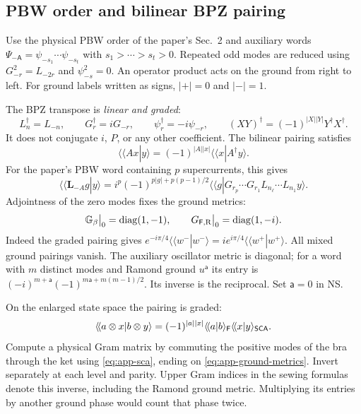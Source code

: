 \subsection{PBW order and bilinear BPZ pairing}
\label{app:pbw}

Use the physical PBW order of the paper's Sec.~2 and auxiliary words
$\Psi_{-\mathsf A}=\psi_{-s_1}\cdots\psi_{-s_t}$ with
$s_1>\cdots>s_t>0$. Repeated odd modes are reduced using
$G_{-r}^2=L_{-2r}$ and $\psi_{-s}^2=0$.
An operator product acts on the ground from right to left.
For ground labels written as signs, $|+|=0$ and $|-|=1$.

The BPZ transpose is \emph{linear and graded}:
\begin{equation}
 L_n^\dagger=L_{-n},\qquad G_r^\dagger=iG_{-r},\qquad
 \psi_r^\dagger=-i\psi_{-r},\qquad
 (XY)^\dagger=(-1)^{|X||Y|}Y^\dagger X^\dagger.
 \label{eq:app-adjoint}
\end{equation}
It does not conjugate $i$, $P$, or any other coefficient. The
bilinear pairing satisfies
\begin{equation}
 \langle\!\langle Ax|y\rangle
 =(-1)^{|A||x|}\langle\!\langle x|A^\dagger y\rangle.
 \label{eq:app-adjoint-pair}
\end{equation}
For the paper's PBW word containing $p$ supercurrents, this gives
\begin{equation}
 \langle\!\langle\mathbf L_{-A}g|y\rangle
 =i^p(-1)^{p|g|+p(p-1)/2}
 \langle\!\langle g|
 G_{r_p}\cdots G_{r_1}L_{n_\ell}\cdots L_{n_1}y\rangle.
 \label{eq:app-pbw-transpose}
\end{equation}
Adjointness of the zero modes fixes the ground metrics:
\begin{equation}
 \mathbb G_\beta\big|_0=\operatorname{diag}(1,-1),\qquad
 G_{\mathsf F,\mathrm R}\big|_0=\operatorname{diag}(1,-i).
 \label{eq:app-ground-metrics}
\end{equation}
Indeed the graded pairing gives
$e^{-i\pi/4}\langle\!\langle w^-|w^-\rangle
=i e^{i\pi/4}\langle\!\langle w^+|w^+\rangle$.
All mixed ground pairings vanish. The auxiliary oscillator metric is
diagonal; for a word with $m$ distinct modes and Ramond ground
$u^{\mathsf a}$ its entry is
$(-i)^{m+\mathsf a}(-1)^{m\mathsf a+m(m-1)/2}$.
Its inverse is the reciprocal. Set $\mathsf a=0$ in NS.

On the enlarged state space the pairing is graded:
\begin{equation}
 \langle\!\langle a\otimes x|b\otimes y\rangle
 =(-1)^{|a||x|}\langle\!\langle a|b\rangle_{\mathsf F}
  \langle\!\langle x|y\rangle_{\mathsf{SCA}}.
 \label{eq:app-product-metric}
\end{equation}
Compute a physical Gram matrix by commuting the positive modes of the
bra through the ket using \eqref{eq:app-sca}, ending on
\eqref{eq:app-ground-metrics}. Invert separately at each level and
parity. Upper Gram indices in the sewing formulas denote this inverse,
including the Ramond ground metric. Multiplying its entries by another
ground phase would count that phase twice.

